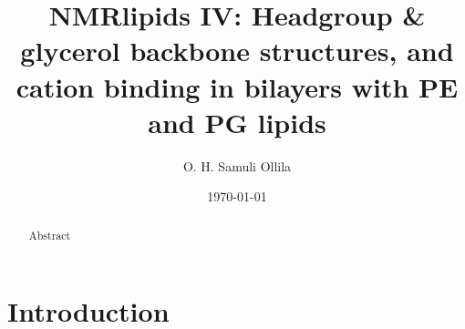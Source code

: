 \documentclass[aps,prl,superscriptaddress,twocolumn]{revtex4}
\begin{document}

\title{NMRlipids IV: Headgroup \& glycerol backbone structures, and cation binding in bilayers with PE and PG lipids} %



\author{O. H. Samuli Ollila}



\date{\today}

\begin{abstract}
Abstract
\end{abstract}


\maketitle %



\section{Introduction}
\end{document}

